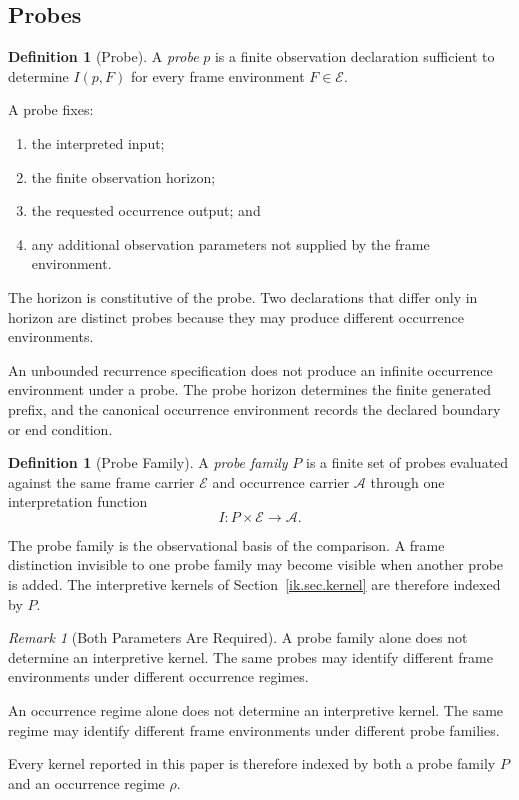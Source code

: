 \documentclass[11pt]{article}
\theoremstyle{plain}
\theoremstyle{definition}
\newtheorem{definition}[theorem]{Definition}
\theoremstyle{remark}
\newtheorem{remark}[theorem]{Remark}
\begin{document}
\subsection{Probes}

\begin{definition}[Probe]
  \label{ik.def.probe}
  A \emph{probe} \(p\)
  is a finite observation declaration
  sufficient to determine \(I(p,F)\)
  for every frame environment \(F\in\mathcal{E}\).

  A probe fixes:
  \begin{enumerate}[label=(\alph*)]
    \item the interpreted input;
    \item the finite observation horizon;
    \item the requested occurrence output; and
    \item any additional observation parameters
          not supplied by the frame environment.
  \end{enumerate}
\end{definition}

The horizon is constitutive of the probe.
Two declarations that differ only in horizon
are distinct probes
because they may produce different occurrence environments.

An unbounded recurrence specification
does not produce an infinite occurrence environment under a probe.
The probe horizon determines the finite generated prefix,
and the canonical occurrence environment records
the declared boundary or end condition.

\begin{definition}[Probe Family]
  \label{ik.def.probe-family}
  A \emph{probe family}
  \(P\)
  is a finite set of probes
  evaluated against the same frame carrier \(\mathcal{E}\)
  and occurrence carrier \(\mathcal{A}\)
  through one interpretation function
  \[
    I:
    P\times\mathcal{E}
    \longrightarrow
    \mathcal{A}.
  \]
\end{definition}

The probe family is the observational basis of the comparison.
A frame distinction invisible to one probe family
may become visible when another probe is added.
The interpretive kernels of Section~\ref{ik.sec.kernel}
are therefore indexed by \(P\).

\begin{remark}[Both Parameters Are Required]
  \label{ik.rem.two-parameters}
  A probe family alone does not determine an interpretive kernel.
  The same probes may identify different frame environments
  under different occurrence regimes.

  An occurrence regime alone does not determine an interpretive kernel.
  The same regime may identify different frame environments
  under different probe families.

  Every kernel reported in this paper
  is therefore indexed by both
  a probe family \(P\)
  and an occurrence regime \(\rho\).
\end{remark}
\end{document}
